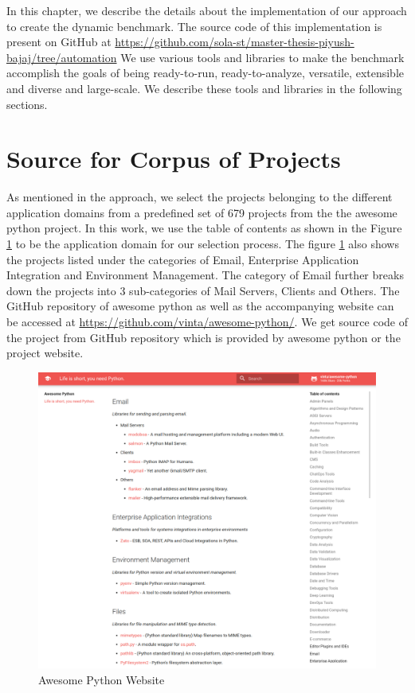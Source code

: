 In this chapter, we describe the details about the implementation of our approach to create the dynamic benchmark. The source code of this implementation is present on GitHub at \url{https://github.com/sola-st/master-thesis-piyush-bajaj/tree/automation}
We use various tools and libraries to make the benchmark accomplish the goals of being ready-to-run, ready-to-analyze, versatile, extensible and diverse and large-scale.
We describe these tools and libraries in the following sections.

\section{Source for Corpus of Projects}
\label{impl:corpus of projects}
As mentioned in the approach, we select the projects belonging to the different application domains from a predefined set of 679 projects from the the awesome python project.
In this work, we use the table of contents as shown in the Figure \ref{fig:awesome-python-website} to be the application domain for our selection process.
The figure \ref{fig:awesome-python-website} also shows the projects listed under the categories of Email, Enterprise Application Integration and Environment Management.
The category of Email further breaks down the projects into 3 sub-categories of Mail Servers, Clients and Others.
The GitHub repository of awesome python as well as the accompanying website can be accessed at \url{https://github.com/vinta/awesome-python/}.
We get source code of the project from GitHub repository which is provided by awesome python or the project website.  

\begin{figure}
    \centering
    \includegraphics[width=1\linewidth, height=1\linewidth]{figures/implementation/Awesome-Python-website3.png}
    \caption{Awesome Python Website}
    \label{fig:awesome-python-website}
\end{figure}

